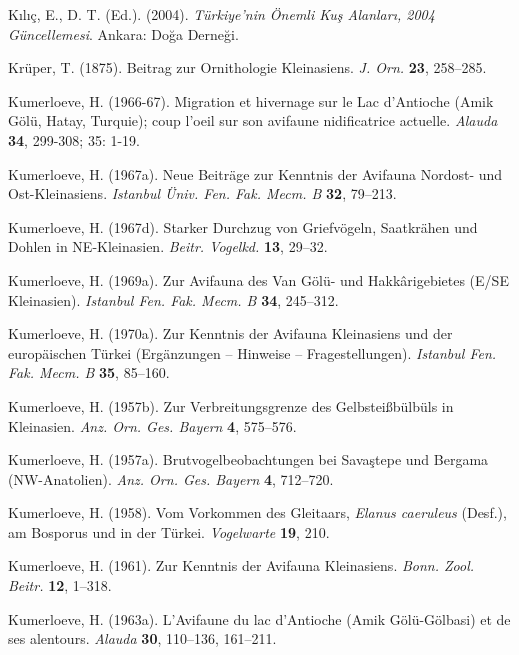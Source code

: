 \documentclass[
  a4paper,
  DIV=11,
  numbers=noendperiod]{scrreprt}
\newlength{\cslhangindent}
\newenvironment{CSLReferences}[2] %
 {\begin{list}{}{%
  \setlength{\itemindent}{0pt}
  \setlength{\leftmargin}{0pt}
  \setlength{\parsep}{0pt}
  \ifodd #1
   \setlength{\leftmargin}{\cslhangindent}
   \setlength{\itemindent}{-1\cslhangindent}
  \fi
  \setlength{\itemsep}{#2\baselineskip}}}
 {\end{list}}
\begin{document}
\begin{CSLReferences}{1}{1}
Kılıç, E., D. T. (Ed.). (2004). \emph{{Türkiye'nin Önemli Kuş Alanları,
2004 Güncellemesi}}. Ankara: Doğa Derneği.

Krüper, T. (1875). {Beitrag zur Ornithologie Kleinasiens}. \emph{J.
Orn.} \textbf{23}, 258--285.

Kumerloeve, H. (1966-67). {Migration et hivernage sur le Lac d'Antioche
(Amik Gölü, Hatay, Turquie); coup l'oeil sur son avifaune nidificatrice
actuelle}. \emph{Alauda} \textbf{34}, 299-308; 35: 1-19.

Kumerloeve, H. (1967a). {Neue Beiträge zur Kenntnis der Avifauna
Nordost- und Ost-Kleinasiens}. \emph{Istanbul Üniv. Fen. Fak. Mecm. B}
\textbf{32}, 79--213.

Kumerloeve, H. (1967d). {Starker Durchzug von Griefvögeln, Saatkrähen
und Dohlen in NE-Kleinasien}. \emph{Beitr. Vogelkd.} \textbf{13},
29--32.

Kumerloeve, H. (1969a). {Zur Avifauna des Van Gölü- und Hakkârigebietes
(E/SE Kleinasien)}. \emph{Istanbul Fen. Fak. Mecm. B} \textbf{34},
245--312.

Kumerloeve, H. (1970a). {Zur Kenntnis der Avifauna Kleinasiens und der
europäischen Türkei (Ergänzungen -- Hinweise -- Fragestellungen)}.
\emph{Istanbul Fen. Fak. Mecm. B} \textbf{35}, 85--160.

Kumerloeve, H. (1957b). {Zur Verbreitungsgrenze des Gelbsteißbülbüls in
Kleinasien}. \emph{Anz. Orn. Ges. Bayern} \textbf{4}, 575--576.

Kumerloeve, H. (1957a). {Brutvogelbeobachtungen bei Savaştepe und
Bergama (NW-Anatolien)}. \emph{Anz. Orn. Ges. Bayern} \textbf{4},
712--720.

Kumerloeve, H. (1958). {Vom Vorkommen des Gleitaars, \emph{Elanus
caeruleus} (Desf.), am Bosporus und in der Türkei}. \emph{Vogelwarte}
\textbf{19}, 210.

Kumerloeve, H. (1961). {Zur Kenntnis der Avifauna Kleinasiens}.
\emph{Bonn. Zool. Beitr.} \textbf{12}, 1--318.

Kumerloeve, H. (1963a). {L'Avifaune du lac d'Antioche (Amik
Gölü-Gölbasi) et de ses alentours}. \emph{Alauda} \textbf{30}, 110--136,
161--211.


\end{CSLReferences}
\end{document}
